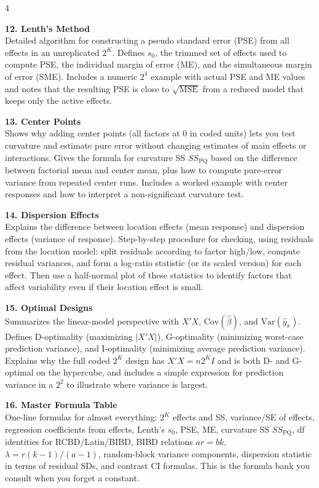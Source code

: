 \documentclass[7pt,letterpaper,landscape]{extarticle}
\begin{document}
\begin{multicols*}{4}
{\textbf{12. Lenth’s Method}\\
Detailed algorithm for constructing a pseudo standard error (PSE) from all effects in an unreplicated $2^K$. Defines $s_0$, the trimmed set of effects used to compute PSE, the individual margin of error (ME), and the simultaneous margin of error (SME). Includes a numeric $2^4$ example with actual PSE and ME values and notes that the resulting PSE is close to $\sqrt{\text{MSE}}$ from a reduced model that keeps only the active effects.

\textbf{13. Center Points}\\
Shows why adding center points (all factors at 0 in coded units) lets you test curvature and estimate pure error without changing estimates of main effects or interactions. Gives the formula for curvature SS $SS_{\text{PQ}}$ based on the difference between factorial mean and center mean, plus how to compute pure-error variance from repeated center runs. Includes a worked example with center responses and how to interpret a non-significant curvature test.

\textbf{14. Dispersion Effects}\\
Explains the difference between location effects (mean response) and dispersion effects (variance of response). Step-by-step procedure for checking, using residuals from the location model: split residuals according to factor high/low, compute residual variances, and form a log-ratio statistic (or its scaled version) for each effect. Then use a half-normal plot of these statistics to identify factors that affect variability even if their location effect is small.

\textbf{15. Optimal Designs}\\
Summarizes the linear-model perspective with $X'X$, $\text{Cov}(\hat\beta)$, and $\text{Var}(\hat y_x)$. Defines D-optimality (maximizing $|X'X|$), G-optimality (minimizing worst-case prediction variance), and I-optimality (minimizing average prediction variance). Explains why the full coded $2^K$ design has $X'X = n2^K I$ and is both D- and G-optimal on the hypercube, and includes a simple expression for prediction variance in a $2^2$ to illustrate where variance is largest.

\textbf{16. Master Formula Table}\\
One-line formulas for almost everything: $2^K$ effects and SS, variance/SE of effects, regression coefficients from effects, Lenth’s $s_0$, PSE, ME, curvature SS $SS_{\text{PQ}}$, df identities for RCBD/Latin/BIBD, BIBD relations $ar=bk$, $\lambda = r(k-1)/(a-1)$, random-block variance components, dispersion statistic in terms of residual SDs, and contrast CI formulas. This is the formula bank you consult when you forget a constant.

}
\end{multicols*}
\end{document}
